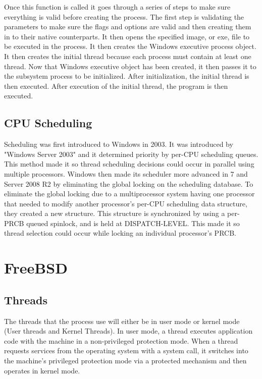 \documentclass[letterpaper,10pt,titlepage,draftclsnofoot,onecolumn]{IEEEtran}
\begin{document}
Once this function is called it goes through a series of steps to make sure everything is valid before creating the process. The first step is validating the parameters to make sure the flags and options are valid and then creating them in to their native counterparts. It then opens the specified image, or exe, file to be executed in the process. It then creates the Windows executive process object. It then creates the initial thread because each process must contain at least one thread. Now that Windows executive object has been created, it then passes it to the subsystem process to be initialized. After initialization, the initial thread is then executed. After execution of the initial thread, the program is then executed. 


\subsection{CPU Scheduling}

Scheduling was first introduced to Windows in 2003. It was introduced by "Windows Server 2003" and it determined priority by per-CPU scheduling queues. \cite{Windows} This method made it so thread scheduling decisions could occur in parallel using multiple processors. Windows then made its scheduler more advanced in 7 and Server 2008 R2 by eliminating the global locking on the scheduling database. To eliminate the global locking due to a multiprocessor system having one processor that needed to modify another processor's per-CPU scheduling data structure, they created a new structure. This structure is synchronized by using a per-PRCB queued spinlock, and is held at DISPATCH-LEVEL. This made it so thread selection could occur while locking an individual processor's PRCB. \cite{Windows} 

\section{FreeBSD}

\subsection{Threads}

The threads that the process use will either be in user mode or kernel mode (User threads and Kernel Threads). In user mode, a thread executes application code with the machine in a non-privileged protection mode. When a thread requests services from the operating system with a system call, it switches into the machine's privileged protection mode via a protected mechanism and then operates in kernel mode. \cite{FreeBSD} 
\end{document}
